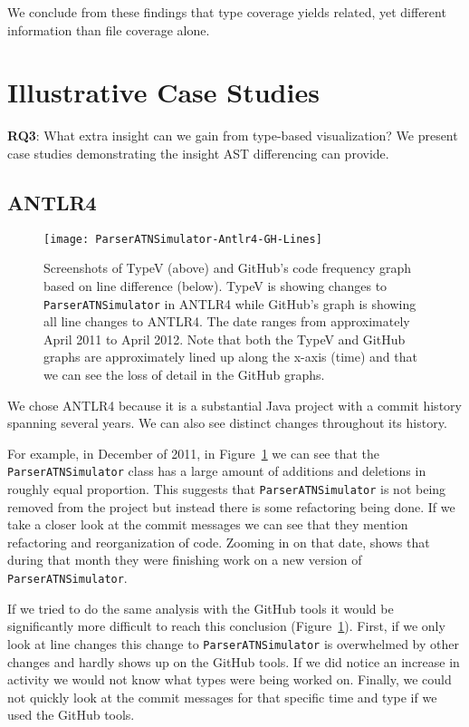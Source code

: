 We conclude from these findings that type coverage yields related, yet different information than file coverage alone.

\section{Illustrative Case Studies}
\label{sec:cases}

\textbf{RQ3}: What extra insight can we gain from type-based visualization? We present case studies demonstrating the insight AST differencing can provide.

\subsection{ANTLR4}\label{sec:antlr4}

\begin{figure}[!ht]
\centering
\texttt{[image: ParserATNSimulator-Antlr4-GH-Lines]}
\caption{Screenshots of TypeV (above) and GitHub's code frequency graph based on line difference (below). TypeV is showing changes to \texttt{ParserATNSimulator} in ANTLR4 while GitHub's graph is showing all line changes to ANTLR4. The date ranges from approximately April 2011 to April 2012. Note that both the TypeV and GitHub graphs are approximately lined up along the x-axis (time) and that we can see the loss of detail in the GitHub graphs.}
\label{fig:parser}
\end{figure}


We chose ANTLR4 because it is a substantial Java project with a commit history spanning several years. We can also see distinct changes throughout its history.

For example, in December of 2011, in Figure~\ref{fig:parser} we can see that the \texttt{ParserATNSimulator} class has a large amount of additions and deletions in roughly equal proportion. This suggests that \texttt{ParserATNSimulator} is not being removed from the project but instead there is some refactoring being done. If we take a closer look at the commit messages we can see that they mention refactoring and reorganization of code. Zooming in on that date,  shows that during that month they were finishing work on a new version of \texttt{ParserATNSimulator}.

If we tried to do the same analysis with the GitHub tools it would be significantly more difficult to reach this conclusion (Figure~\ref{fig:parser}). First, if we only look at line changes this change to \texttt{ParserATNSimulator} is overwhelmed by other changes and hardly shows up on the GitHub tools. If we did notice an increase in activity we would not know what types were being worked on. Finally, we could not quickly look at the commit messages for that specific time and type if we used the GitHub tools.

